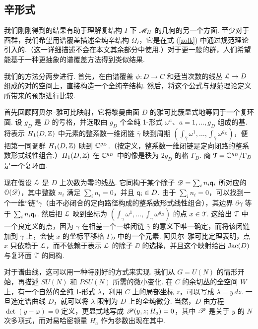 \subsection{辛形式}
\label{sympform}

我们刚刚得到的结果有助于理解复结构 $I$ 下 $\MH$ 的几何的另一个方面. 至少对于酉群，我们希望用谱覆盖描述全纯辛结构 $\Omega_I$，它是在式 (\ref{zolk}) 中通过规范理论引入的.（这一详细描述不会在本文其余部分中使用.）对于更一般的群，人们希望能基于一种更抽象的谱覆盖方法得到类似结果.

我们的方法分两步进行. 首先，在由谱覆盖 $\psi:D\to C$ 和适当次数的线丛 ${\cal L}\to D$ 组成的对的空间上，直接构造一个全纯辛结构. 然后，将这个公式与规范理论定义所带来的预期进行比较.

首先回顾阿贝尔–雅可比映射，它将黎曼曲面 $D$ 的雅可比簇显式地等同于一个复环面. 设 $g_D$ 是 $D$ 的亏格，并选取由 $g_D$ 个全纯 1-形式 $\omega^a$、$a=1,\dots, g_D$ 组成的基. 将表示 $H_1(D,\Bbb{Z})$ 中元素的整系数一维闭链 $\bar \gamma$ 映到周期 $(\int_{\bar\gamma}\omega^1,\dots,\int_{\bar
\gamma}\omega^{g_D})$，便把第一同调群 $H_1(D,\Bbb{Z})$ 映到 $\Bbb{C}^{g_D}$.（按定义，整系数一维闭链是定向闭路的整系数形式线性组合.）$H_1(D,\Bbb{Z})$ 在 $\Bbb{C}^{g_D}$ 中的像是秩为 $2g_D$ 的格 $\Gamma_D$. 商 ${\cal T}=\Bbb{C}^{g_D}/\Gamma_D$ 是一个复环面.

现在假设 ${\cal L}$ 是 $D$ 上次数为零的线丛. 它同构于某个除子 ${\DD}=\sum_in_i\qq_i$ 所对应的 ${\cal O}({\DD})$，其中整数 $n_i$ 满足 $\sum_in_i=0$，并且 $\qq_i\in D$. 由于 $\sum_in_i=0$，可以找到一个一维“链”$\gamma$（由不必闭合的定向路径构成的整系数形式线性组合），其边界 $\partial\gamma$ 等于 $\sum_i
n_i\qq_i$. 然后把 ${\cal L}$ 映到坐标为 $(\int_\gamma \omega^1,\dots,\int_\gamma
\omega^{g_D})$ 的点 $x\in {\cal T}$. 这给出 ${\cal T}$ 中一个良定义的点，因为 $\gamma$ 在相差一个一维闭链 $\bar\gamma$ 的意义下唯一确定，而将该闭链加到 $\gamma$ 上，会使 $x$ 的坐标平移格 $\Gamma_D$ 中的一个元素. 阿贝尔–雅可比定理表明，点 $x$ 只依赖于 ${\cal L}$，而不依赖于表示 ${\cal L}$ 的除子 ${\DD}$ 的选择，并且这个映射给出 ${\rm Jac}(D)$ 与复环面 ${\cal T}$ 的同构.

对于谱曲线，这可以用一种特别好的方式来实现. 我们从 $G=U(N)$ 的情形开始，再描述 $SU(N)$ 和 $PSU(N)$ 所需的微小变化. 在 $C$ 的余切丛的全空间 $W$ 上，有一个自然的全纯 1-形式 $\lambda$，利用 $C$ 上的局部坐标 $z$，可以写成 $\lambda=y\, dz$. 一旦选定谱曲线 $D$，就可以将 $\lambda$ 限制为 $D$ 上的全纯微分. 当然，$D$ 由方程 $\det(y-\varphi)=0$ 定义，更显式地写成 $\PP(y,z;H_a)=0$，其中 $\PP$ 是关于 $y$ 的 $N$ 次多项式，而对易哈密顿量 $H_a$ 作为参数出现在其中.

